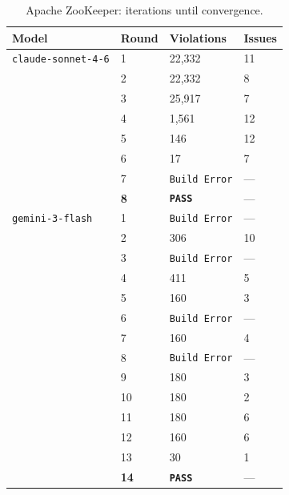 \documentclass[sigconf,screen]{acmart}
\begin{document}
\begin{table}[t]
    \centering
    \small
    \caption{Apache ZooKeeper: iterations until convergence.}
    \label{tab:convergence-zookeeper}
    \begin{tabular}{@{}p{}C{0.25\columnwidth}p{0.20\columnwidth}C{0.15\columnwidth}@{}}
        \toprule
        \textbf{Model} & \textbf{Round} & \textbf{Violations} & \textbf{Issues} \\
        \midrule
        \texttt{claude-sonnet-4-6} & 1 & 22,332 & 11 \\
                                                    & 2 & 22,332 & 8 \\
                                                    & 3 & 25,917 & 7 \\
                                                    & 4 & 1,561 & 12 \\
                                                    & 5 & 146 & 12 \\
                                                    & 6 & 17 & 7 \\
                                                    & 7 & \texttt{Build Error} & --- \\
                                                    & \textbf{8} & \texttt{\textbf{PASS}} & --- \\
        \texttt{gemini-3-flash} & 1 & \texttt{Build Error} & --- \\
                                            & 2 & 306 & 10 \\
                                            & 3 & \texttt{Build Error} & --- \\
                                            & 4 & 411 & 5 \\
                                            & 5 & 160 & 3 \\
                                            & 6 & \texttt{Build Error} & --- \\
                                            & 7 & 160 & 4 \\
                                            & 8 & \texttt{Build Error} & --- \\
                                            & 9 & 180 & 3 \\
                                            & 10 & 180 & 2 \\
                                            & 11 & 180 & 6 \\
                                            & 12 & 160 & 6 \\
                                            & 13 & 30 & 1 \\
                                            & \textbf{14} & \texttt{\textbf{PASS}} & --- \\
        \bottomrule
    \end{tabular}
\end{table}
\end{document}
